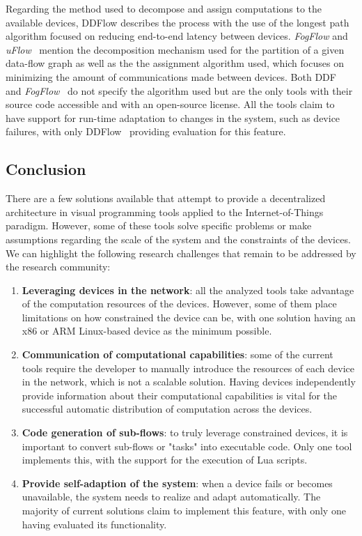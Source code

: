 Regarding the method used to decompose and assign computations to the available devices, DDFlow describes the process with the use of the longest path algorithm focused on reducing end-to-end latency between devices. \textit{FogFlow} and \textit{uFlow}~\cite{fog_flow,flow_based_programming_fog} mention the decomposition mechanism used for the partition of a given data-flow graph as well as the the assignment algorithm used, which focuses on minimizing the amount of communications made between devices. Both DDF~\cite{ddf} and \textit{FogFlow}~\cite{fog_flow_easy,fog_flow_tool} do not specify the algorithm used but are the only tools with their source code accessible and with an open-source license. All the tools claim to have support for run-time adaptation to changes in the system, such as device failures, with only DDFlow~\cite{ddflow} providing evaluation for this feature.


\subsection{Conclusion}\label{sec:decentralized_sota_conclusion}

There are a few solutions available that attempt to provide a decentralized architecture in visual programming tools applied to the Internet-of-Things paradigm. However, some of these tools solve specific problems or make assumptions regarding the scale of the system and the constraints of the devices. We can highlight the following research challenges that remain to be addressed by the research community:

\begin{enumerate}
    \item \textbf{Leveraging devices in the network}: all the analyzed tools take advantage of the computation resources of the devices. However, some of them place limitations on how constrained the device can be, with one solution having an x86 or ARM Linux-based device as the minimum possible.
    \item \textbf{Communication of computational capabilities}: some of the current tools require the developer to manually introduce the resources of each device in the network, which is not a scalable solution. Having devices independently provide information about their computational capabilities is vital for the successful automatic distribution of computation across the devices.
    \item \textbf{Code generation of sub-flows}: to truly leverage constrained devices, it is important to convert sub-flows or "tasks" into executable code. Only one tool implements this, with the support for the execution of Lua scripts.
    \item \textbf{Provide self-adaption of the system}: when a device fails or becomes unavailable, the system needs to realize and adapt automatically. The majority of current solutions claim to implement this feature, with only one having evaluated its functionality.
\end{enumerate}

